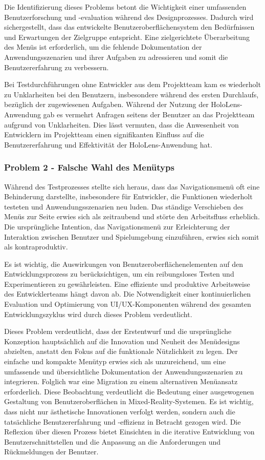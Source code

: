 Die Identifizierung dieses Problems betont die Wichtigkeit einer umfassenden Benutzerforschung und -evaluation während
des Designprozesses. Dadurch wird sichergestellt, dass das entwickelte Benutzeroberflächensystem den Bedürfnissen und
Erwartungen der Zielgruppe entspricht. Eine zielgerichtete Überarbeitung des Menüs ist erforderlich, um die fehlende
Dokumentation der Anwendungsszenarien und ihrer Aufgaben zu adressieren und somit die Benutzererfahrung zu verbessern.

Bei Testdurchführungen ohne Entwickler aus dem Projektteam kam es wiederholt zu Unklarheiten bei den Benutzern,
insbesondere während des ersten Durchlaufs, bezüglich der zugewiesenen Aufgaben. Während der Nutzung der HoloLens-Anwendung
gab es vermehrt Anfragen seitens der Benutzer an das Projektteam aufgrund von Unklarheiten. Dies lässt vermuten, dass
die Anwesenheit von Entwicklern im Projektteam einen signifikanten Einfluss auf die Benutzererfahrung und Effektivität
der HoloLens-Anwendung hat.


\subsubsection*{Problem 2 - Falsche Wahl des Menütyps}
Während des Testprozesses stellte sich heraus, dass das Navigationsmenü oft eine Behinderung darstellte, insbesondere
für Entwickler, die Funktionen wiederholt testeten und Anwendungsszenarien neu luden. Das ständige Verschieben des Menüs
zur Seite erwies sich als zeitraubend und störte den Arbeitsfluss erheblich. Die ursprüngliche Intention, das
Navigationsmenü zur Erleichterung der Interaktion zwischen Benutzer und Spielumgebung einzuführen, erwies sich somit als kontraproduktiv.

Es ist wichtig, die Auswirkungen von Benutzeroberflächenelementen auf den Entwicklungsprozess zu berücksichtigen, um ein
reibungsloses Testen und Experimentieren zu gewährleisten. Eine effiziente und produktive Arbeitsweise des
Entwicklerteams hängt davon ab. Die Notwendigkeit einer kontinuierlichen Evaluation und Optimierung von
UI/UX-Komponenten während des gesamten Entwicklungszyklus wird durch dieses Problem verdeutlicht.

Dieses Problem verdeutlicht, dass der Erstentwurf und die ursprüngliche Konzeption hauptsächlich auf die Innovation und
Neuheit des Menüdesigns abzielten, anstatt den Fokus auf die funktionale Nützlichkeit zu legen. Der einfache und kompakte
Menütyp erwies sich als unzureichend, um eine umfassende und übersichtliche Dokumentation der Anwendungsszenarien zu
integrieren. Folglich war eine Migration zu einem alternativen Menüansatz erforderlich. Diese Beobachtung verdeutlicht
die Bedeutung einer ausgewogenen Gestaltung von Benutzeroberflächen in Mixed-Reality-Systemen. Es ist wichtig, dass
nicht nur ästhetische Innovationen verfolgt werden, sondern auch die tatsächliche Benutzererfahrung und -effizienz in
Betracht gezogen wird. Die Reflexion über diesen Prozess bietet Einsichten in die iterative Entwicklung von
Benutzerschnittstellen und die Anpassung an die Anforderungen und Rückmeldungen der Benutzer.

